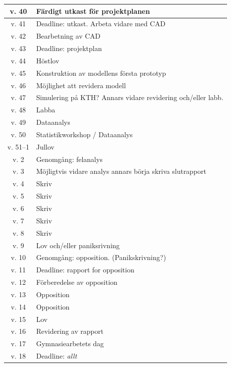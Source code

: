 \begin{center}
    \begin{tabular}{|c||l|}
        \hline
        v. 40 & Färdigt utkast för projektplanen \\\hline
        v. 41 & Deadline: utkast. Arbeta vidare med CAD \\\hline
        v. 42 & Bearbetning av CAD \\\hline
        v. 43 & Deadline: projektplan \\\hline
        v. 44 & Höstlov \\\hline
        v. 45 & Konstruktion av modellens första prototyp \\\hline
        v. 46 & Möjlighet att revidera modell \\\hline
        v. 47 & Simulering på KTH? Annars vidare revidering och/eller labb. \\\hline
        v. 48 & Labba \\\hline
        v. 49 & Dataanalys \\\hline
        v. 50 & Statistikworkshop / Dataanalys \\\hline
        v. 51--1 & Jullov \\\hline
        v. 2 & Genomgång: felanalys \\\hline
        v. 3 & Möjligtvis vidare analys annars börja skriva slutrapport \\\hline
        v. 4 & Skriv \\\hline
        v. 5 & Skriv \\\hline
        v. 6 & Skriv \\\hline
        v. 7 & Skriv \\\hline
        v. 8 & Skriv \\\hline
        v. 9 & Lov och/eller paniksrivning \\\hline
        v. 10 & Genomgång: opposition. (Panikskrivning?) \\\hline
        v. 11 & Deadline: rapport for opposition \\\hline
        v. 12 & Förberedelse av opposition  \\\hline
        v. 13 & Opposition \\\hline
        v. 14 & Opposition \\\hline
        v. 15 & Lov \\\hline
        v. 16 & Revidering av rapport \\\hline
        v. 17 & Gymnasiearbetets dag \\\hline
        v. 18 & Deadline: \textit{allt} \\\hline
    \end{tabular}
\end{center}